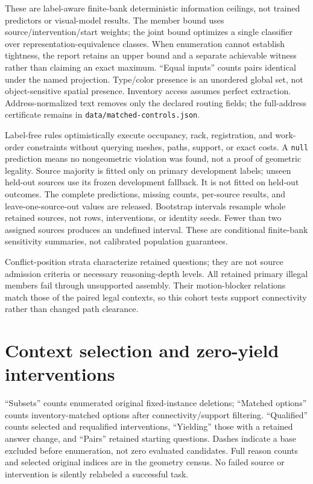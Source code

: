 \begin{center}\small

\end{center}
These are label-aware finite-bank deterministic information ceilings,
not trained predictors or visual-model results. The member bound uses
source/intervention/start weights; the joint bound optimizes a single
classifier over representation-equivalence classes. When enumeration
cannot establish tightness, the report retains an upper bound and a
separate achievable witness rather than claiming an exact maximum.
``Equal inputs'' counts pairs identical under the named projection.
Type/color presence is an unordered global set, not object-sensitive
spatial presence. Inventory access assumes perfect extraction.
Address-normalized text removes only the declared routing fields;
the full-address certificate remains in \texttt{data/matched-controls.json}.

\begin{center}\small

\end{center}
Label-free rules optimistically execute occupancy, rack, registration, and
work-order constraints without querying meshes, paths, support, or exact
costs. A \texttt{null} prediction means no nongeometric violation was found,
not a proof of geometric legality. Source majority is fitted only on primary
development labels; unseen held-out sources use its frozen development
fallback. It is not fitted on held-out outcomes. The complete predictions,
missing counts, per-source results, and leave-one-source-out values are
released. Bootstrap intervals resample whole retained sources, not rows,
interventions, or identity seeds. Fewer than two assigned sources produces
an undefined interval. These are conditional finite-bank sensitivity
summaries, not calibrated population guarantees.

\begin{center}\small

\end{center}
Conflict-position strata characterize retained questions; they are not
source admission criteria or necessary reasoning-depth levels.
All retained primary illegal members fail through unsupported assembly.
Their motion-blocker relations match those of the paired legal contexts,
so this cohort tests support connectivity rather than changed path clearance.

\section{Context selection and zero-yield interventions}
``Subsets'' counts enumerated original fixed-instance deletions; ``Matched
options'' counts inventory-matched options after connectivity/support
filtering. ``Qualified'' counts selected and requalified interventions,
``Yielding'' those with a retained answer change, and ``Pairs'' retained
starting questions. Dashes indicate a base excluded before enumeration,
not zero evaluated candidates. Full reason counts and selected original
indices are in the geometry census. No failed source or intervention is
silently relabeled a successful task.
\begingroup\small

\endgroup

